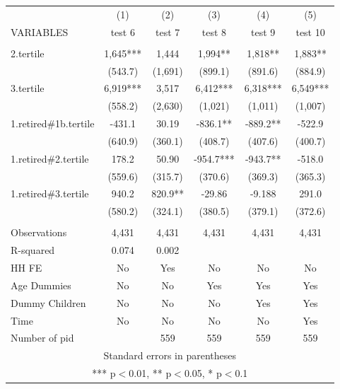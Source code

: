 \begin{tabular}{lccccc} \hline
 & (1) & (2) & (3) & (4) & (5) \\
VARIABLES & test 6 & test 7 & test 8 & test 9 & test 10 \\ \hline
 &  &  &  &  &  \\
2.tertile & 1,645*** & 1,444 & 1,994** & 1,818** & 1,883** \\
 & (543.7) & (1,691) & (899.1) & (891.6) & (884.9) \\
3.tertile & 6,919*** & 3,517 & 6,412*** & 6,318*** & 6,549*** \\
 & (558.2) & (2,630) & (1,021) & (1,011) & (1,007) \\
1.retired\#1b.tertile & -431.1 & 30.19 & -836.1** & -889.2** & -522.9 \\
 & (640.9) & (360.1) & (408.7) & (407.6) & (400.7) \\
1.retired\#2.tertile & 178.2 & 50.90 & -954.7*** & -943.7** & -518.0 \\
 & (559.6) & (315.7) & (370.6) & (369.3) & (365.3) \\
1.retired\#3.tertile & 940.2 & 820.9** & -29.86 & -9.188 & 291.0 \\
 & (580.2) & (324.1) & (380.5) & (379.1) & (372.6) \\
 &  &  &  &  &  \\
Observations & 4,431 & 4,431 & 4,431 & 4,431 & 4,431 \\
R-squared & 0.074 & 0.002 &  &  &  \\
HH FE & No & Yes & No & No & No \\
Age Dummies & No & No & Yes & Yes & Yes \\
Dummy Children & No & No & No & Yes & Yes \\
Time & No & No & No & No & Yes \\
 Number of pid &  & 559 & 559 & 559 & 559 \\ \hline
\multicolumn{6}{c}{ Standard errors in parentheses} \\
\multicolumn{6}{c}{ *** p$<$0.01, ** p$<$0.05, * p$<$0.1} \\
\end{tabular}
